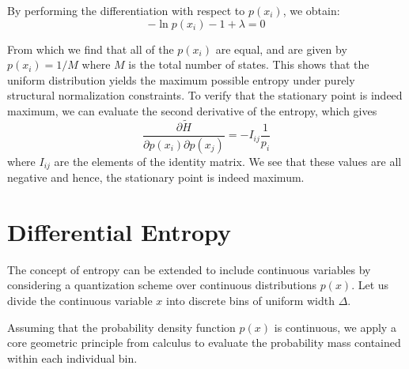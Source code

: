 \documentclass[11pt,a4paper]{article}
\begin{document}
By performing the differentiation with respect to $p(x_i)$, we obtain:
\begin{equation}
-\ln p(x_i) - 1 + \lambda = 0
\end{equation}

From which we find that all of the $p(x_i)$ are equal, and are given by $p(x_i) = 1/M$ where $M$ is the total number of states. This shows that the uniform distribution yields the maximum possible entropy under purely structural normalization constraints. To verify that the stationary point is indeed maximum, we can evaluate the second derivative of the entropy, which gives 
\begin{equation}
\frac{\partial \tilde{H}}{\partial p(x_i)\partial p(x_j)} = -I_{ij} \frac{1}{p_i}
\end{equation}
where $I_{ij}$ are the elements of the identity matrix. We see that these values are all negative and hence, the stationary point is indeed maximum. 
\section{Differential Entropy}
The concept of entropy can be extended to include continuous variables by considering a quantization scheme over continuous distributions $p(x)$. Let us divide the continuous variable $x$ into discrete bins of uniform width $\Delta$. 

Assuming that the probability density function $p(x)$ is continuous, we apply a core geometric principle from calculus to evaluate the probability mass contained within each individual bin.
\end{document}
